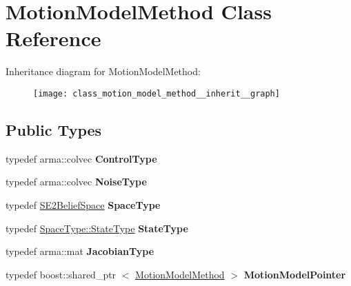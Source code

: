 \hypertarget{class_motion_model_method}{\section{\-Motion\-Model\-Method \-Class \-Reference}
\label{class_motion_model_method}
}


\-Inheritance diagram for \-Motion\-Model\-Method\-:\nopagebreak
\begin{figure}[H]
\begin{center}
\leavevmode
\texttt{[image: class\_motion\_model\_method\_\_inherit\_\_graph]}
\end{center}
\end{figure}
\subsection*{\-Public \-Types}
\begin{DoxyCompactItemize}
\item 
\hypertarget{class_motion_model_method_a3d2d250cadace8b47d5eca028a2220e4}{typedef arma\-::colvec {\bfseries \-Control\-Type}}\label{class_motion_model_method_a3d2d250cadace8b47d5eca028a2220e4}

\item 
\hypertarget{class_motion_model_method_aecf04875853e2ecbebc66eb720adc63b}{typedef arma\-::colvec {\bfseries \-Noise\-Type}}\label{class_motion_model_method_aecf04875853e2ecbebc66eb720adc63b}

\item 
\hypertarget{class_motion_model_method_ada60008f50c4ec1f48956bf99fa846ed}{typedef \hyperlink{class_s_e2_belief_space}{\-S\-E2\-Belief\-Space} {\bfseries \-Space\-Type}}\label{class_motion_model_method_ada60008f50c4ec1f48956bf99fa846ed}

\item 
\hypertarget{class_motion_model_method_a15b3c3801cb64f85bfff7d088d276d91}{typedef \hyperlink{class_s_e2_belief_space_1_1_state_type}{\-Space\-Type\-::\-State\-Type} {\bfseries \-State\-Type}}\label{class_motion_model_method_a15b3c3801cb64f85bfff7d088d276d91}

\item 
\hypertarget{class_motion_model_method_a2c6d9dc15fc37a1d5079f72c4114ebed}{typedef arma\-::mat {\bfseries \-Jacobian\-Type}}\label{class_motion_model_method_a2c6d9dc15fc37a1d5079f72c4114ebed}

\item 
\hypertarget{class_motion_model_method_a94a8bd757d2cfb258a47cdd69079e506}{typedef boost\-::shared\-\_\-ptr\*
$<$ \hyperlink{class_motion_model_method}{\-Motion\-Model\-Method} $>$ {\bfseries \-Motion\-Model\-Pointer}}\label{class_motion_model_method_a94a8bd757d2cfb258a47cdd69079e506}

\end{DoxyCompactItemize}
